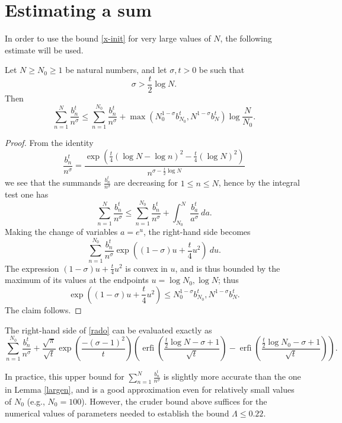 \section{Estimating a sum}

In order to use the bound \eqref{x-init} for very large values of $N$, the following estimate will be used.

\begin{lemma}\label{largen}
Let $N \geq N_0 \geq 1$ be natural numbers, and let $\sigma,t > 0$ be such that
$$ \sigma > \frac{t}{2} \log N.$$
Then
$$ \sum_{n=1}^N \frac{b_n^t}{n^\sigma} \leq \sum_{n=1}^{N_0}
\frac{b_n^t}{n^\sigma}  + 
\max( N_0^{1-\sigma} b_{N_0}^t, N^{1-\sigma} b_N^t ) \log \frac{N}{N_0}.$$
\end{lemma}

\begin{proof}  From the identity
$$ \frac{b_n^t}{n^\sigma} = \frac{\exp\left( \frac{t}{4} (\log N - \log n)^2 - \frac{t}{4} (\log N)^2\right) }{n^{\sigma - \frac{t}{2} \log N}}$$
we see that the summands $\frac{b_n^t}{n^\sigma}$ are decreasing for $1 \leq n \leq N$, hence by the integral test one has
\begin{equation}\label{rado}
 \sum_{n=1}^N \frac{b_n^t}{n^\sigma} \leq \sum_{n=1}^{N_0}
\frac{b_n^t}{n^\sigma}  + \int_{N_0}^N \frac{b_a^t}{a^\sigma}\ da.
\end{equation}
Making the change of variables $a = e^u$, the right-hand side becomes
$$\sum_{n=1}^{N_0} \frac{b_n^t}{n^\sigma} \exp( (1-\sigma) u + \frac{t}{4} u^2 )\ du.$$
The expression $(1-\sigma) u + \frac{t}{4} u^2$ is convex in $u$, and is thus bounded by the maximum of its values at the endpoints $u = \log N_0, \log N$; thus
$$\exp( (1-\sigma) u + \frac{t}{4} u^2) \leq N_0^{1-\sigma} b_{N_0}^t, N^{1-\sigma} b_N^t.$$
The claim follows. 
\end{proof}

\begin{remark}  The right-hand side of \eqref{rado} can be evaluated exactly as
$$
\sum_{n=1}^{N_0}
\frac{b_n^t}{n^\sigma}  + \frac{\sqrt \pi}{\sqrt t} \exp(\frac{-(\sigma - 1)^2}{t}) \left( \operatorname{erfi}\left(\frac{\frac{t}{2} \log N  - \sigma + 1}{\sqrt t} \right) - \operatorname{erfi}\left(\frac{\frac{t}{2} \log N_0  - \sigma + 1}{\sqrt t}\right) \right).$$

In practice, this upper bound for $\sum_{n=1}^N \frac{b_n^t}{n^\sigma}$ is slightly more accurate than the one in Lemma \ref{largen}, and is a good approximation even for relatively small values of $N_0$ (e.g., $N_0=100$).  However, the cruder bound above suffices for the numerical values of parameters needed to establish the bound $\Lambda \leq 0.22$.
\end{remark}

